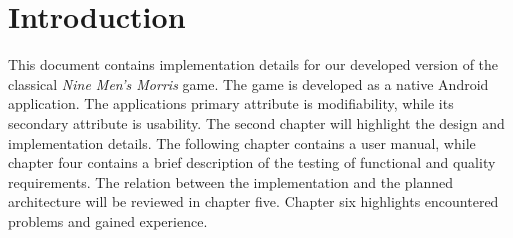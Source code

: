 \section{Introduction}


This document contains implementation details for our developed version of the classical \emph{Nine Men's Morris} game. The game is developed as a native Android application. The applications primary attribute is modifiability, while its secondary attribute is usability. The second chapter will highlight the design and implementation details. The following chapter contains a user manual, while chapter four contains a brief description of the testing of functional and quality requirements. The relation between the implementation and the planned architecture will be reviewed in chapter five. Chapter six highlights encountered problems and gained experience.




